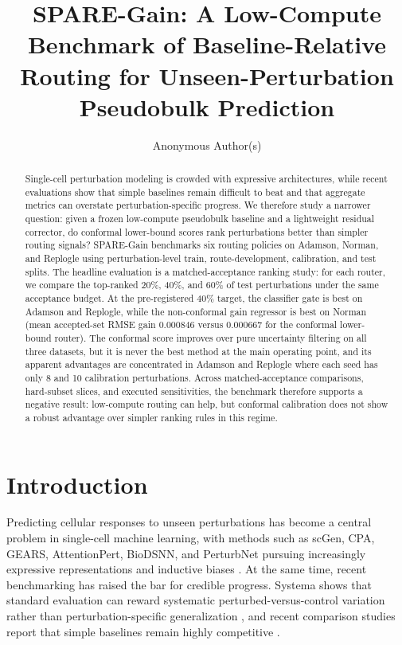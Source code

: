 \documentclass{article}
\title{SPARE-Gain: A Low-Compute Benchmark of Baseline-Relative Routing for Unseen-Perturbation Pseudobulk Prediction}
\author{Anonymous Author(s)}
\begin{document}
\maketitle

\begin{abstract}
Single-cell perturbation modeling is crowded with expressive architectures, while recent evaluations show that simple baselines remain difficult to beat and that aggregate metrics can overstate perturbation-specific progress. We therefore study a narrower question: given a frozen low-compute pseudobulk baseline and a lightweight residual corrector, do conformal lower-bound scores rank perturbations better than simpler routing signals? SPARE-Gain benchmarks six routing policies on Adamson, Norman, and Replogle using perturbation-level train, route-development, calibration, and test splits. The headline evaluation is a matched-acceptance ranking study: for each router, we compare the top-ranked 20\%, 40\%, and 60\% of test perturbations under the same acceptance budget. At the pre-registered 40\% target, the classifier gate is best on Adamson and Replogle, while the non-conformal gain regressor is best on Norman (mean accepted-set RMSE gain 0.000846 versus 0.000667 for the conformal lower-bound router). The conformal score improves over pure uncertainty filtering on all three datasets, but it is never the best method at the main operating point, and its apparent advantages are concentrated in Adamson and Replogle where each seed has only 8 and 10 calibration perturbations. Across matched-acceptance comparisons, hard-subset slices, and executed sensitivities, the benchmark therefore supports a negative result: low-compute routing can help, but conformal calibration does not show a robust advantage over simpler ranking rules in this regime.
\end{abstract}

\section{Introduction}
Predicting cellular responses to unseen perturbations has become a central problem in single-cell machine learning, with methods such as scGen, CPA, GEARS, AttentionPert, BioDSNN, and PerturbNet pursuing increasingly expressive representations and inductive biases \citep{lotfollahi2019scgen,lotfollahi2023cpa,roohani2024gears,bai2024attentionpert,tan2024biodsnn,yu2025perturbnet}. At the same time, recent benchmarking has raised the bar for credible progress. Systema shows that standard evaluation can reward systematic perturbed-versus-control variation rather than perturbation-specific generalization \citep{vinastorne2025systema}, and recent comparison studies report that simple baselines remain highly competitive \citep{ahlmanneltze2025linearbaseline,kernfeld2025forecasting}.
\end{document}
